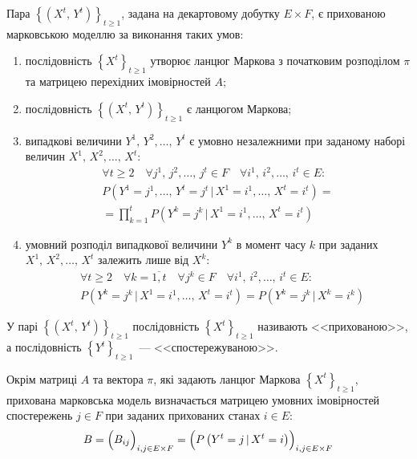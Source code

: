 \begin{definition}\label{def: HMM}
    Пара $\left\{\left( X^t,\,Y^t \right)\right\}_{t\geqslant 1}$, задана на декартовому добутку $E\times F$, є прихованою марковською моделлю за виконання таких умов:
    \begin{enumerate}
        \item послідовність $\left\{ X^t \right\}_{t\geqslant 1}$ утворює ланцюг Маркова з початковим розподілом $\pi$ та матрицею перехідних імовірностей $A$;
        \item послідовність $\left\{\left( X^t,\,Y^t \right)\right\}_{t\geqslant 1}$ є ланцюгом Маркова;
        \item випадкові величини $Y^1,\,Y^2,\ldots,\,Y^t$ є умовно незалежними при заданому наборі величин $X^1,\,X^2,\ldots,\,X^t:$
        \begin{multline*}
            \forall t\geqslant 2 \quad \forall j^1,\,j^2,\ldots,\,j^t \in F \quad \forall i^1,\,i^2,\ldots,\,i^t \in E: \\
            P\left( Y^1=j^1,\ldots,\,Y^t=j^t \,|\, X^1=i^1,\ldots,\,X^t=i^t \right) = \\
            = \prod\limits_{k=1}^{t}P\left( Y^k=j^k \,|\, X^1=i^1,\ldots,\,X^t=i^t \right)
        \end{multline*}
        \item умовний розподіл випадкової величини $Y^k$ в момент часу $k$ при заданих $X^1,\,X^2,\ldots,\,X^t$ залежить лише від $X^k:$
        \begin{align*}
            & \forall t\geqslant 2 \quad \forall k=\overline{1,t} \quad \forall j^k \in F \quad \forall i^1,\,i^2,\ldots,\,i^t \in E: \\
            & P\left( Y^k=j^k \,|\, X^1=i^1,\ldots,\,X^t=i^t \right) = P\left( Y^k=j^k \,|\, X^k=i^k \right)
        \end{align*}
    \end{enumerate}
\end{definition}

У парі $\left\{\left( X^t,\,Y^t \right)\right\}_{t\geqslant 1}$ послідовність $\left\{ X^t \right\}_{t\geqslant 1}$ називають <<прихованою>>, а послідовність $\left\{ Y^t \right\}_{t\geqslant 1}$~--- <<спостережуваною>>.

Окрім матриці $A$ та вектора $\pi$, які задають ланцюг Маркова $\left\{ X^t \right\}_{t\geqslant 1}$, прихована марковська модель визначається матрицею умовних імовірностей спостережень $j \in F$ при заданих прихованих станах $i \in E:$
\begin{equation*}
    B = \Bigl( B_{ij} \Bigr)_{i,j \in E \times F} = \Bigl( P\left( Y^{t}=j \,|\, X^{t}=i \right) \Bigr)_{i,j \in E \times F}
\end{equation*} 

